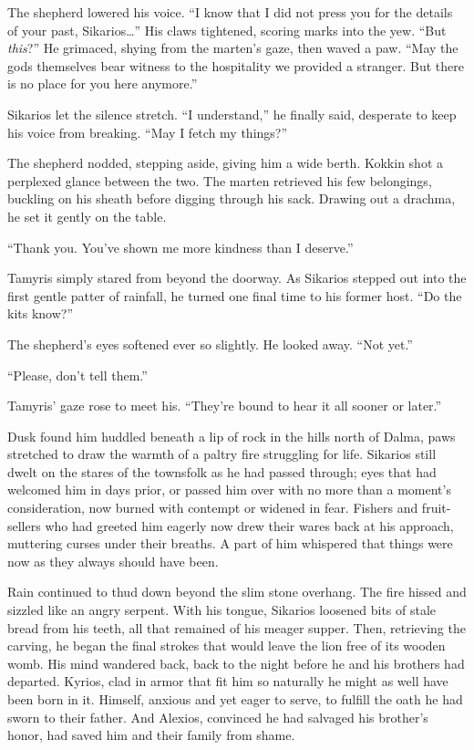 The shepherd lowered his voice. ``I know that I did not press you for the details of your past, Sikarios\ldots'' His claws tightened, scoring marks into the yew. ``But \emph{this}?'' He grimaced, shying from the marten's gaze, then waved a paw. ``May the gods themselves bear witness to the hospitality we provided a stranger. But there is no place for you here anymore.''

Sikarios let the silence stretch. ``I understand,'' he finally said, desperate to keep his voice from breaking. ``May I fetch my things?''

The shepherd nodded, stepping aside, giving him a wide berth. Kokkin shot a perplexed glance between the two. The marten retrieved his few belongings, buckling on his sheath before digging through his sack. Drawing out a drachma, he set it gently on the table.

``Thank you. You've shown me more kindness than I deserve.''

Tamyris simply stared from beyond the doorway. As Sikarios stepped out into the first gentle patter of rainfall, he turned one final time to his former host. ``Do the kits know?''

The shepherd's eyes softened ever so slightly. He looked away. ``Not yet.''

``Please, don't tell them.''

Tamyris' gaze rose to meet his. ``They're bound to hear it all sooner or later.''

\secdiv

Dusk found him huddled beneath a lip of rock in the hills north of Dalma, paws stretched to draw the warmth of a paltry fire struggling for life. Sikarios still dwelt on the stares of the townsfolk as he had passed through; eyes that had welcomed him in days prior, or passed him over with no more than a moment's consideration, now burned with contempt or widened in fear. Fishers and fruit-sellers who had greeted him eagerly now drew their wares back at his approach, muttering curses under their breaths. A part of him whispered that things were now as they always should have been.

Rain continued to thud down beyond the slim stone overhang. The fire hissed and sizzled like an angry serpent. With his tongue, Sikarios loosened bits of stale bread from his teeth, all that remained of his meager supper. Then, retrieving the carving, he began the final strokes that would leave the lion free of its wooden womb. His mind wandered back, back to the night before he and his brothers had departed. Kyrios, clad in armor that fit him so naturally he might as well have been born in it. Himself, anxious and yet eager to serve, to fulfill the oath he had sworn to their father. And Alexios, convinced he had salvaged his brother's honor, had saved him and their family from shame.

